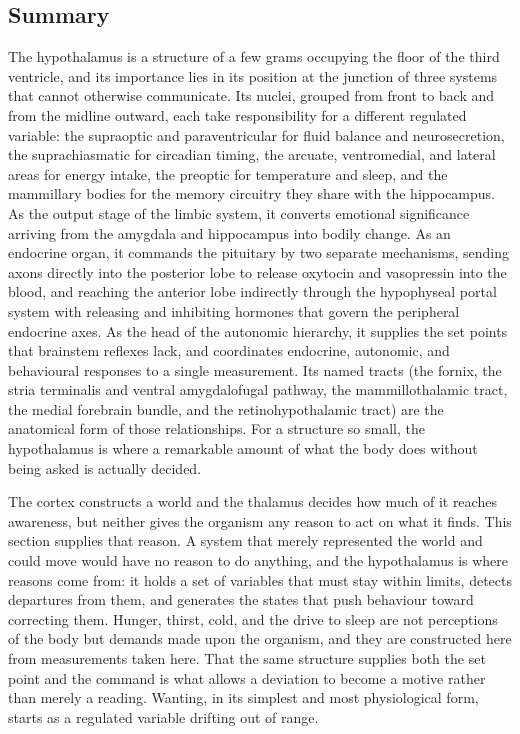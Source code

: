 \documentclass[11pt]{article}
\begin{document}
\subsection{Summary}

The hypothalamus is a structure of a few grams occupying the floor of the third ventricle, and its importance lies in its position at the junction of three systems that cannot otherwise communicate. Its nuclei, grouped from front to back and from the midline outward, each take responsibility for a different regulated variable: the supraoptic and paraventricular for fluid balance and neurosecretion, the suprachiasmatic for circadian timing, the arcuate, ventromedial, and lateral areas for energy intake, the preoptic for temperature and sleep, and the mammillary bodies for the memory circuitry they share with the hippocampus. As the output stage of the limbic system, it converts emotional significance arriving from the amygdala and hippocampus into bodily change. As an endocrine organ, it commands the pituitary by two separate mechanisms, sending axons directly into the posterior lobe to release oxytocin and vasopressin into the blood, and reaching the anterior lobe indirectly through the hypophyseal portal system with releasing and inhibiting hormones that govern the peripheral endocrine axes. As the head of the autonomic hierarchy, it supplies the set points that brainstem reflexes lack, and coordinates endocrine, autonomic, and behavioural responses to a single measurement. Its named tracts (the fornix, the stria terminalis and ventral amygdalofugal pathway, the mammillothalamic tract, the medial forebrain bundle, and the retinohypothalamic tract) are the anatomical form of those relationships. For a structure so small, the hypothalamus is where a remarkable amount of what the body does without being asked is actually decided.

The cortex constructs a world and the thalamus decides how much of it reaches awareness, but neither gives the organism any reason to act on what it finds. This section supplies that reason. A system that merely represented the world and could move would have no reason to do anything, and the hypothalamus is where reasons come from: it holds a set of variables that must stay within limits, detects departures from them, and generates the states that push behaviour toward correcting them. Hunger, thirst, cold, and the drive to sleep are not perceptions of the body but demands made upon the organism, and they are constructed here from measurements taken here. That the same structure supplies both the set point and the command is what allows a deviation to become a motive rather than merely a reading. Wanting, in its simplest and most physiological form, starts as a regulated variable drifting out of range.
\end{document}
